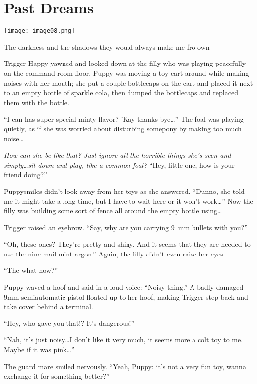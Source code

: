 \chapter{Past Dreams}

\texttt{[image: image08.png]}

\begin{intro}
    The darkness and the shadows they would always make me fro-own
\end{intro}


Trigger Happy yawned and looked down at the filly who was playing peacefully on the command room floor. Puppy was moving a toy cart around while making noises with her mouth; she put a couple bottlecaps on the cart and placed it next to an empty bottle of sparkle cola, then dumped the bottlecaps and replaced them with the bottle.

``I can has super special minty flavor? 'Kay thanks bye\dots'' The foal was playing quietly, as if she was worried about disturbing somepony by making too much noise\dots

\emph{How can she be like that? Just ignore all the horrible things she's seen and simply\dots sit down and play, like a common foal?} ``Hey, little one, how is your friend doing?''

Puppysmiles didn't look away from her toys as she answered. ``Dunno, she told me it might take a long time, but I have to wait here or it won't work\dots'' Now the filly was building some sort of fence all around the empty bottle using\dots

Trigger raised an eyebrow. ``Say, why are you carrying \SI{9}{mm} bullets with you?''

``Oh, these ones? They're pretty and shiny. And it seems that they are needed to use the nine mail mint argon.'' Again, the filly didn't even raise her eyes.

``The what now?''

Puppy waved a hoof and said in a loud voice: ``Noisy thing.'' A badly damaged 9mm semiautomatic pistol floated up to her hoof, making Trigger step back and take cover behind a terminal.

``Hey, who gave you that!? It's dangerous!''

``Nah, it's just noisy\dots I don't like it very much, it seems more a colt toy to me. Maybe if it was pink\dots''

The guard mare smiled nervously. ``Yeah, Puppy: it's not a very fun toy, wanna exchange it for something better?''


